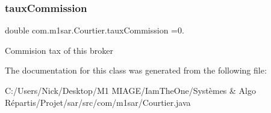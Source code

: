 \subsubsection{\texorpdfstring{taux\+Commission}{tauxCommission}}
{\footnotesize\ttfamily double com.\+m1sar.\+Courtier.\+taux\+Commission =0.\hspace{0.3cm}{\ttfamily [static]}}

Commision tax of this broker 

The documentation for this class was generated from the following file\+:\begin{DoxyCompactItemize}
\item 
C\+:/\+Users/\+Nick/\+Desktop/\+M1 M\+I\+A\+G\+E/\+Iam\+The\+One/\+Systèmes \& Algo Répartis/\+Projet/sar/src/com/m1sar/Courtier.\+java\end{DoxyCompactItemize}
